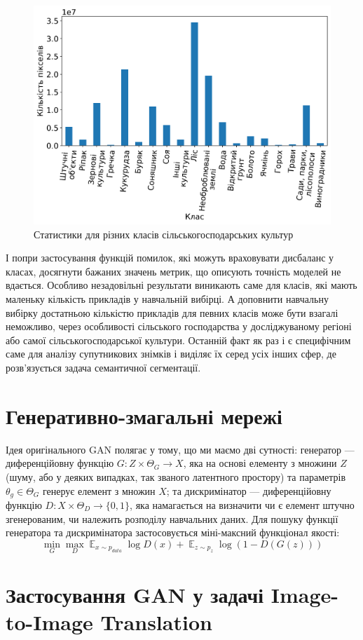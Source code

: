 \documentclass{ConfFTI}
\DeclareMathOperator{\E}{\mathbb{E}}
\begin{document}
\begin{figure}[ht!]
	\centering
	\includegraphics[width=0.49 \textwidth]{assets/dist_real.png}
	\caption{Статистики для різних класів сільськогосподарських культур}
	\label{fig:pixels_per_class}
\end{figure}

І попри застосування
функцій помилок, які можуть враховувати дисбаланс у
класах, досягнути бажаних значень метрик, що описують точність
моделей не вдається.
Особливо незадовільні результати виникають саме для класів,
які мають маленьку кількість прикладів у навчальній вибірці.
А доповнити навчальну вибірку достатньою кількістю
прикладів для певних класів може бути взагалі неможливо,
через особливості сільського господарства у досліджуваному регіоні
або самої сільськогосподарської культури. Останній факт як раз
і є специфічним саме для аналізу супутникових знімків і
виділяє їх серед усіх інших сфер,
де розв'язується задача семантичної сегментації.

\section{Генеративно-змагальні мережі}

Ідея оригінального GAN  \cite{goodfellow2014generative}
полягає у тому, що ми маємо дві сутності:
генератор --- диференційовну функцію $G: Z \times \Theta_G \rightarrow X$, яка
на основі елементу з множини $Z$(шуму, або у деяких випадках,
так званого латентного простору) та параметрів $\theta_g \in \Theta_G$
генерує елемент з множин $X$; та дискримінатор
--- диференційовну функцію $D: X \times \Theta_D \rightarrow \{0, 1\}$, яка
намагається на визначити чи є елемент штучно згенерованим, чи
належить розподілу навчальних даних. Для пошуку функції
генератора та дискримінатора застосовується міні-максний функціонал якості:
$$ \min\limits_{G}\max\limits_{D}
	\E_{x \sim p_{data}} \log D(x) +
	\E_{z \sim p_{z}} \log (1 - D(G(z))) $$

\section{Застосування GAN у задачі Image-to-Image Translation}
\end{document}
